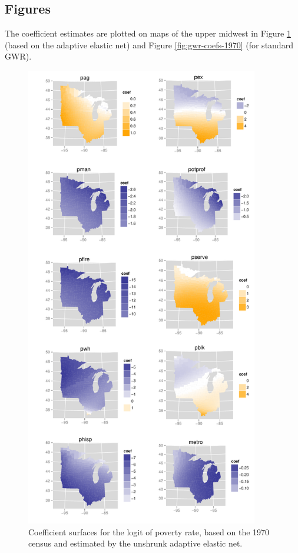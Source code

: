 \documentclass[authoryear, review, 11pt]{elsarticle}
\begin{document}
	\subsection{Figures}
	The coefficient estimates are plotted on maps of the upper midwest in Figure \ref{fig:unshrunk-enet-coefs-1970} (based on the adaptive elastic net) and Figure \ref{fig:gwr-coefs-1970} (for standard GWR).
	\begin{figure}
		\begin{center}
			\includegraphics[height=8in]{../../figures/poverty/1970.linear.coefficients.unshrunk.pdf}
			\caption{Coefficient surfaces for the logit of poverty rate, based on the 1970 census and estimated by the unshrunk adaptive elastic net. \label{fig:unshrunk-enet-coefs-1970}}
		\end{center}
	\end{figure}	
	
\end{document}

